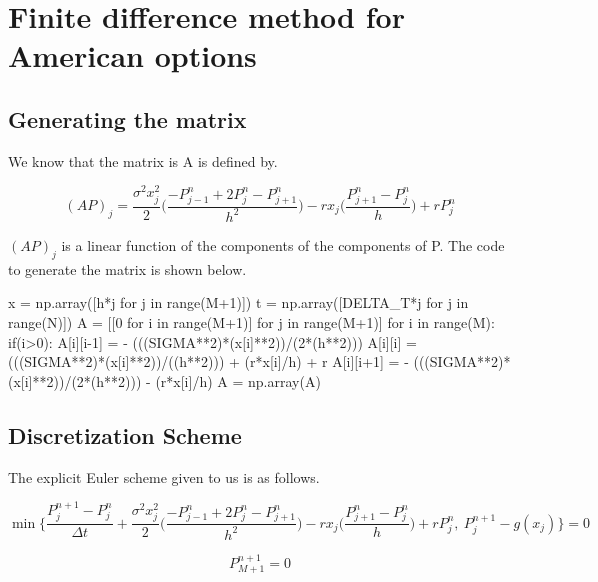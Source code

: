 \documentclass[12pt]{report}
\begin{document}
\chapter*{Finite difference method for American options}

\section*{Generating the matrix}
We know that the matrix is A is defined by.

\begin{equation*}
	(AP)_j=\frac{\sigma^2x_j^2}{2}\bigg(\frac{-P^n_{j-1}+2P^n_{j}-P^n_{j+1}}{h^2}\bigg)-rx_j\bigg(\frac{P^n_{j+1}-P^n_{j}}{h}\bigg)+rP^n_{j}
\end{equation*}

$(AP)_j$ is a linear function of the components of the components of P. The code to generate the matrix is shown below.
\\
\begin{python}
	x = np.array([h*j for j in range(M+1)])
	t = np.array([DELTA_T*j for j in range(N)])
	A = [[0 for i in range(M+1)] for j in range(M+1)]
	for i in range(M):
 	 if(i>0):
	  A[i][i-1] = - (((SIGMA**2)*(x[i]**2))/(2*(h**2))) 
	  A[i][i] =  (((SIGMA**2)*(x[i]**2))/((h**2))) + (r*x[i]/h) + r
	  A[i][i+1] = - (((SIGMA**2)*(x[i]**2))/(2*(h**2))) - (r*x[i]/h)
	A = np.array(A)
\end{python}

\section*{Discretization Scheme}

The explicit Euler scheme given to us is as follows. 

\begin{equation*}
\min{\bigg\{\frac{P_j^{n+1}-P_j^{n}}{\Delta t}+\frac{\sigma^2x_j^2}{2}\bigg(\frac{-P^n_{j-1}+2P^n_{j}-P^n_{j+1}}{h^2}\bigg)-rx_j\bigg(\frac{P^n_{j+1}-P^n_{j}}{h}\bigg)+rP^n_{j},\ P_j^{n+1}-g(x_j)\bigg\}}=0
\end{equation*}

\begin{equation*}
P_{M+1}^{n+1}=0
\end{equation*}
\end{document}
